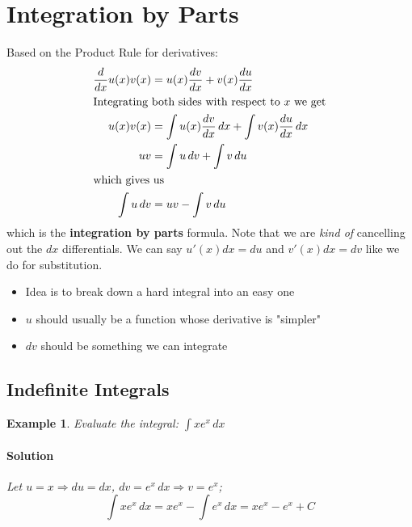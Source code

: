 \documentclass[letterpaper, 11pt, openany]{book}
\theoremstyle{mytheoremstyle}
\theoremstyle{myexamplestyle}
\newtheorem{example}{Example}[section]
\newenvironment{solution}{\paragraph{\sffamily \smaller \fontseries{b}\selectfont Solution}}{\hfill\faSquare}
\begin{document}
\section{Integration by Parts}
\setcounter{figure}{0}

Based on the Product Rule for derivatives:
\begin{align*}
    \frac{d}{dx} u(x) v(x) &= u(x)\frac{dv}{dx} + v(x) \frac{du}{dx}\\
    \intertext{Integrating both sides with respect to $x$ we get}
    u(x)v(x) &= \int u(x)\frac{dv}{dx} \, dx + \int v(x) \frac{du}{dx} \, dx\\
    uv &= \int u \, dv + \int v \, du\\
    \intertext{which gives us}
    \int u \, dv &= uv - \int v\, du
\end{align*}
which is the \textbf{integration by parts} formula. Note that we are \textit{kind of} cancelling out the \(dx\) differentials. We can say \(u'(x) dx = du\) and \(v'(x) dx = dv\) like we do for substitution.
\begin{itemize}
    \item Idea is to break down a hard integral into an easy one
    \item $u$ should usually be a function whose derivative is "simpler"
    \item $dv$ should be something we can integrate
\end{itemize}

\subsection{Indefinite Integrals}
\begin{example}\label{e:ibpexp}
Evaluate the integral: $\displaystyle \int x e^{x}\, dx$

\begin{solution}
    Let $u = x \Rightarrow du = dx$, $dv = e^{x}\, dx \Rightarrow v = e^{x}$;
    \[\int x e^{x}\, dx = x e^{x} - \int e^{x}\, dx = x e^{x} - e^{x} + C\]
\end{solution}
\end{example}
\end{document}
